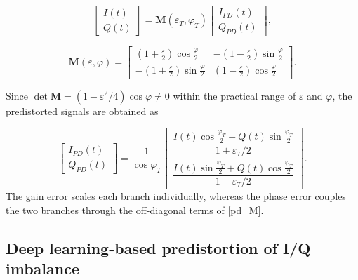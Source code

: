 \documentclass[lettersize,journal]{IEEEtran}
\begin{document}
\begin{equation}
\label{pd_mat}
\begin{bmatrix} I(t) \\ Q(t) \end{bmatrix}
= \mathbf{M}(\varepsilon_T,\varphi_T)
\begin{bmatrix} I_{PD}(t) \\ Q_{PD}(t) \end{bmatrix},
\end{equation}

\begin{equation}
\label{pd_M}
\mathbf{M}(\varepsilon,\varphi) =
\begin{bmatrix}
\left(1+\frac{\varepsilon}{2}\right)\cos\frac{\varphi}{2} & -\left(1-\frac{\varepsilon}{2}\right)\sin\frac{\varphi}{2} \\[0.5em]
-\left(1+\frac{\varepsilon}{2}\right)\sin\frac{\varphi}{2} & \left(1-\frac{\varepsilon}{2}\right)\cos\frac{\varphi}{2}
\end{bmatrix}.
\end{equation}

Since $\det \mathbf{M} = (1-\varepsilon^2/4)\cos\varphi \neq 0$ within the practical range of $\varepsilon$ and $\varphi$, the predistorted signals are obtained as

\begin{equation}
\label{pd_IQ}
\begin{bmatrix} I_{PD}(t) \\[0.4em] Q_{PD}(t) \end{bmatrix}
= \frac{1}{\cos\varphi_T}
\begin{bmatrix}
\dfrac{I(t)\cos\frac{\varphi_T}{2} + Q(t)\sin\frac{\varphi_T}{2}}{1+\varepsilon_T/2} \\[1.1em]
\dfrac{I(t)\sin\frac{\varphi_T}{2} + Q(t)\cos\frac{\varphi_T}{2}}{1-\varepsilon_T/2}
\end{bmatrix}.
\end{equation}
The gain error scales each branch individually, whereas the phase error couples the two branches through the off-diagonal terms of \eqref{pd_M}.

\subsection{Deep learning-based predistortion of I/Q imbalance} \label{deep_learn_pred}
\end{document}
